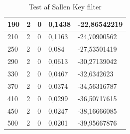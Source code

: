 \begin{table}[h!]
\begin{tabular}{l|l|l|l|l}
		\hline
		190 & 2 & 0 & 0,1438 & -22,86542219 \\
		\hline
		210 & 2 & 0 & 0,1163 & -24,70900562 \\
		\hline
		250 & 2 & 0 & 0,084 & -27,53501419 \\
		\hline
		290 & 2 & 0 & 0,0613 & -30,27139042 \\
		\hline
		330 & 2 & 0 & 0,0467 & -32,6342623 \\
		\hline
		370 & 2 & 0 & 0,0374 & -34,56316787 \\
		\hline
		410 & 2 & 0 & 0,0299 & -36,50717615 \\
		\hline
		450 & 2 & 0 & 0,0247 & -38,16666085 \\
		\hline
		500 & 2 & 0 & 0,0201 & -39,95667876
	\end{tabular}
\caption{Test af Sallen Key filter}
\label{tab:filtertest}
\end{table}